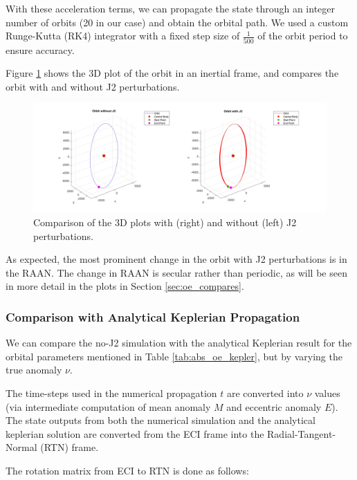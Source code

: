 With these acceleration terms, we can propagate the state through an integer number of orbits (20 in our case) and obtain the orbital path. We used a custom Runge-Kutta (RK4) integrator with a fixed step size of $\frac{1}{500}$ of the orbit period to ensure accuracy. 

Figure \ref{fig:3d_plots_with_j2} shows the 3D plot of the orbit in an inertial frame, and compares the orbit with and without J2 perturbations.

\begin{figure}[H]
    \centering
    \includegraphics[width=1.1\linewidth]{PS1/Figures/Orbit_J2_Comparison_ECI.jpg}
    \caption{Comparison of the 3D plots with (right) and without (left) J2 perturbations. }
    \label{fig:3d_plots_with_j2}
\end{figure}

As expected, the most prominent change in the orbit with J2 perturbations is in the RAAN. The change in RAAN is secular rather than periodic, as will be seen in more detail in the plots in Section \ref{sec:oe_compares}.

\subsubsection{Comparison with Analytical Keplerian Propagation} \label{sec:analytical_and_eci2rtn}

We can compare the no-J2 simulation with the analytical Keplerian result for the orbital parameters mentioned in Table \ref{tab:abs_oe_kepler}, but by varying the true anomaly $\nu$. 

The time-steps used in the numerical propagation $t$ are converted into $\nu$ values (via intermediate computation of mean anomaly $M$ and eccentric anomaly $E$). The state outputs from both the numerical simulation and the analytical keplerian solution are converted from the ECI frame into the Radial-Tangent-Normal (RTN) frame.

The rotation matrix from ECI to RTN is done as follows:

